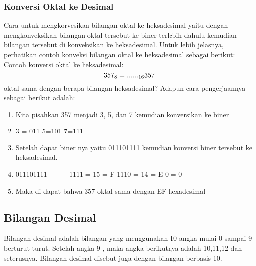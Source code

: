 \subsubsection{Konversi Oktal ke Desimal}
Cara untuk mengkorvesikan bilangan oktal ke heksadesimal yaitu dengan mengkonveksikan bilangan oktal tersebut ke biner terlebih dahulu kemudian bilangan tersebut di konveksikan ke heksadesimal. Untuk lebih jelasnya, perhatikan contoh konveksi bilangan oktal ke heksadesimal sebagai berikut:
\\ Contoh konversi oktal ke heksadesimal:
\begin{equation}
\\357_{8}=......_{16} 357 \end{equation}oktal sama dengan berapa bilangan heksadesimal?
Adapun cara pengerjaannya sebagai berikut adalah:
\begin{enumerate}
\item Kita pisahkan 357 menjadi 3, 5, dan 7 kemudian konversikan ke biner 
\item 3 = 011 5=101 7=111
\item Setelah dapat biner nya yaitu 011101111 kemudian konversi biner tersebut ke heksadesimal. 
\item 011101111 -------- 1111 = 15 = F 1110 = 14 = E 0 = 0
\item Maka di dapat bahwa 357 oktal sama dengan EF hexadesimal 
\end{enumerate}

\subsection{Bilangan Desimal}
Bilangan desimal adalah bilangan yang menggunakan 10 angka mulai 0 sampai 9 berturut-turut. Setelah angka 9 , maka angka berikutnya adalah 10,11,12 dan seterusnya. Bilangan desimal disebut juga dengan bilangan berbasis 10.
